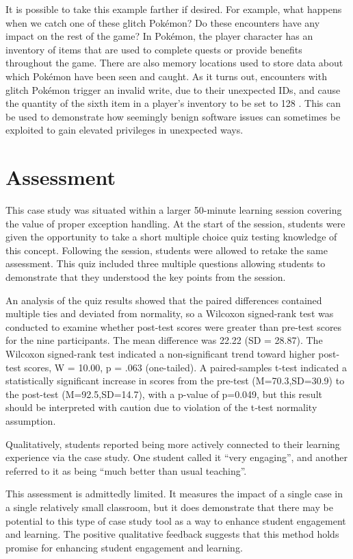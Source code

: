 \documentclass[letterpaper]{article}
\begin{document}
It is possible to take this example farther if desired. For example, what happens when we catch one of these glitch Pokémon? Do these encounters have any impact on the rest of the game? In Pokémon, the player character has an inventory of items that are used to complete quests or provide benefits throughout the game. There are also memory locations used to store data about which Pokémon have been seen and caught. As it turns out, encounters with glitch Pokémon trigger an invalid write, due to their unexpected IDs, and cause the quantity of the sixth item in a player's inventory to be set to 128 \cite{bulbapedia2010}. This can be used to demonstrate how seemingly benign software issues can sometimes be exploited to gain elevated privileges in unexpected ways.

\section{Assessment}
This case study was situated within a larger 50-minute learning session covering the value of proper exception handling. At the start of the session, students were given the opportunity to take a short multiple choice quiz testing knowledge of this concept. Following the session, students were allowed to retake the same assessment. This quiz included three multiple questions allowing students to demonstrate that they understood the key points from the session.

An analysis of the quiz results showed that the paired differences contained multiple ties and deviated from normality, so a Wilcoxon signed-rank test was conducted to examine whether post-test scores were greater than pre-test scores for the nine participants. The mean difference was 22.22 (SD = 28.87). The Wilcoxon signed-rank test indicated a non-significant trend toward higher post-test scores, W = 10.00, p = .063 (one-tailed). A paired-samples t-test indicated a statistically significant increase in scores from the pre-test (M=70.3,SD=30.9) to the post-test (M=92.5,SD=14.7), with a p-value of p=0.049, but this result should be interpreted with caution due to violation of the t‑test normality assumption.

Qualitatively, students reported being more actively connected to their learning experience via the case study. One student called it ``very engaging'', and another referred to it as being ``much better than usual teaching''.

This assessment is admittedly limited. It measures the impact of a single case in a single relatively small classroom, but it does demonstrate that there may be potential to this type of case study tool as a way to enhance student engagement and learning. The positive qualitative feedback suggests that this method holds promise for enhancing student engagement and learning.
\end{document}
